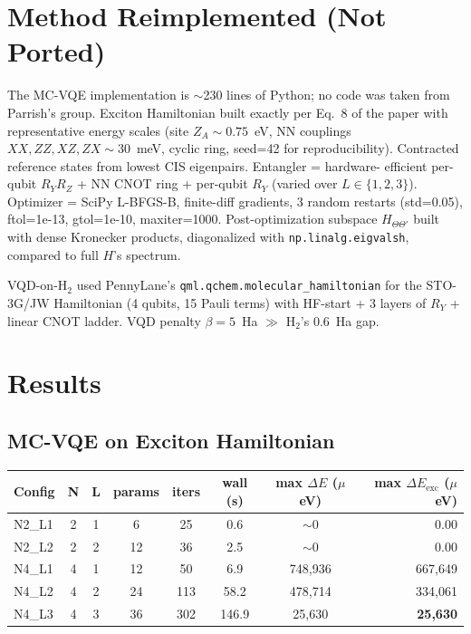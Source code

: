 \documentclass[11pt]{article}
\begin{document}
\section{Method Reimplemented (Not Ported)}
The MC-VQE implementation is $\sim$230 lines of Python; no code was taken from
Parrish's group. Exciton Hamiltonian built exactly per Eq.~8 of the paper with
representative energy scales (site $Z_A \sim 0.75$~eV, NN couplings
$XX, ZZ, XZ, ZX \sim 30$~meV, cyclic ring, seed=42 for reproducibility).
Contracted reference states from lowest CIS eigenpairs. Entangler = hardware-
efficient per-qubit $R_Y R_Z$ + NN CNOT ring + per-qubit $R_Y$ (varied over
$L \in \{1,2,3\}$). Optimizer = SciPy L-BFGS-B, finite-diff gradients, 3 random
restarts (std=0.05), ftol=1e-13, gtol=1e-10, maxiter=1000. Post-optimization
subspace $H_{\Theta\Theta'}$ built with dense Kronecker products, diagonalized
with \texttt{np.linalg.eigvalsh}, compared to full $H$'s spectrum.

VQD-on-H$_2$ used PennyLane's \texttt{qml.qchem.molecular\_hamiltonian} for the
STO-3G/JW Hamiltonian (4 qubits, 15 Pauli terms) with HF-start + 3 layers of
$R_Y$ + linear CNOT ladder. VQD penalty $\beta=5$~Ha $\gg$ H$_2$'s 0.6~Ha gap.

\section{Results}

\subsection{MC-VQE on Exciton Hamiltonian}
\begin{center}
\begin{tabular}{lccccccr}
\toprule
Config & N & L & params & iters & wall (s) & max $\Delta E$ ($\mu$eV) & max $\Delta E_{\text{exc}}$ ($\mu$eV) \\
\midrule
N2\_L1 & 2 & 1 & 6  & 25  &   0.6 &   $\sim$0 &   0.00 \\
N2\_L2 & 2 & 2 & 12 & 36  &   2.5 &   $\sim$0 &   0.00 \\
N4\_L1 & 4 & 1 & 12 & 50  &   6.9 & 748{,}936 & 667{,}649 \\
N4\_L2 & 4 & 2 & 24 & 113 &  58.2 & 478{,}714 & 334{,}061 \\
N4\_L3 & 4 & 3 & 36 & 302 & 146.9 &  25{,}630 & \textbf{25{,}630} \\
\bottomrule
\end{tabular}
\end{center}
\end{document}

